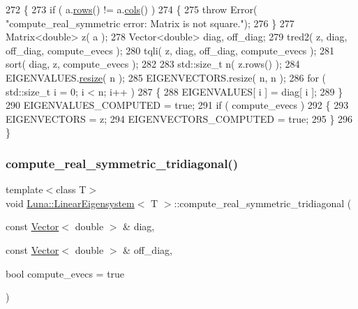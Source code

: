\begin{DoxyCode}
272   \{
273     \textcolor{keywordflow}{if} ( a.\hyperlink{classLuna_1_1Matrix_ae7b0b30c3e22ba252d660f093757295e}{rows}() != a.\hyperlink{classLuna_1_1Matrix_aa7472f90f4c470535e722f3a389a19b1}{cols}() )
274     \{
275       \textcolor{keywordflow}{throw} Error( \textcolor{stringliteral}{"compute\_real\_symmetric error: Matrix is not square."});
276     \}
277     Matrix<double> z( a );
278     Vector<double> diag, off\_diag;
279     tred2( z, diag, off\_diag, compute\_evecs );
280     tqli( z, diag, off\_diag, compute\_evecs );
281     sort( diag, z, compute\_evecs );
282 
283     std::size\_t n( z.rows() );
284     EIGENVALUES.\hyperlink{classLuna_1_1Vector_ae1394f960d5cac3e60f6b1561f38e453}{resize}( n );
285     EIGENVECTORS.resize( n, n );
286     \textcolor{keywordflow}{for} ( std::size\_t i = 0; i < n; i++ )
287     \{
288       EIGENVALUES[ i ] = diag[ i ];
289     \}
290     EIGENVALUES\_COMPUTED = \textcolor{keyword}{true};
291     \textcolor{keywordflow}{if} ( compute\_evecs )
292     \{
293       EIGENVECTORS = z;
294       EIGENVECTORS\_COMPUTED = \textcolor{keyword}{true};
295     \}
296   \}
\end{DoxyCode}
\mbox{\label{classLuna_1_1LinearEigensystem_a91ac311c3fe4226c4652b6bf41fc0d91}} 
\subsubsection{\texorpdfstring{compute\+\_\+real\+\_\+symmetric\+\_\+tridiagonal()}{compute\_real\_symmetric\_tridiagonal()}\hspace{0.1cm}{\footnotesize\ttfamily [1/2]}}
{\footnotesize\ttfamily template$<$class T$>$ \\
void \hyperlink{classLuna_1_1LinearEigensystem}{Luna\+::\+Linear\+Eigensystem}$<$ T $>$\+::compute\+\_\+real\+\_\+symmetric\+\_\+tridiagonal (\begin{DoxyParamCaption}\item[{const \hyperlink{classLuna_1_1Vector}{Vector}$<$ double $>$ \&}]{diag,  }\item[{const \hyperlink{classLuna_1_1Vector}{Vector}$<$ double $>$ \&}]{off\+\_\+diag,  }\item[{bool}]{compute\+\_\+evecs = {\ttfamily true} }\end{DoxyParamCaption})}



